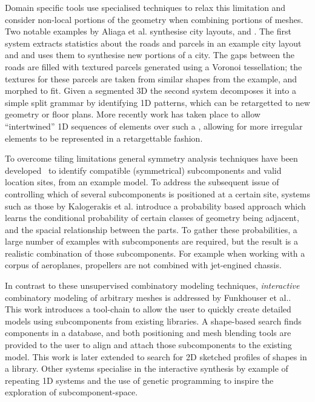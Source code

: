 Domain specific tools use specialised techniques to relax this limitation and consider non-local portions of the geometry when combining portions of meshes. 
Two notable examples by Aliaga et al. synthesise city layouts, and 
\facades{}. The first system\cite{Aliaga07} extracts statistics about the roads and parcels in an example city layout and and uses them to synthesise new portions of a city. The gaps between the roads are filled with textured parcels generated using a Voronoi tessellation; the textures for these parcels are taken from similar shapes from the example, and morphed to fit. Given a segmented 3D \facade{} the second system\cite{Aliaga07} decomposes it into a simple split grammar by identifying 1D patterns, which can be retargetted to new geometry or floor plans. More recently work has taken place to allow ``intertwined'' 1D sequences of elements over such a \facade{}, allowing for more irregular elements to be represented in a retargettable fashion\cite{Lin11}.

To overcome tiling limitations general symmetry analysis techniques have been developed~\cite{Mitra06} to identify compatible (symmetrical) subcomponents and valid location sites, from an example model\cite{Bokeloh10}. To address the subsequent issue of controlling which of several subcomponents is positioned at a certain site, systems such as those by Kalogerakis et al. introduce a probability based approach\cite{Kalogerakis12} which learns the conditional probability of certain classes of geometry being adjacent, and the spacial relationship between the parts. To gather these probabilities, a large number of examples with subcomponents are required, but the result is a realistic combination of those subcomponents. For example when working with a corpus of aeroplanes, propellers are not combined with jet-engined chassis. 

In contrast to these unsupervised combinatory modeling techniques, \emph{interactive} combinatory modeling of arbitrary meshes is addressed by Funkhouser et al.\cite{Funkhouser04}. This work introduces a tool-chain to allow the user to quickly create detailed models using subcomponents from existing libraries. A shape-based search finds components in a database, and both positioning and mesh blending tools are provided to the user to align and attach those subcomponents to the existing model. This work is later extended to search for 2D sketched profiles of shapes in a library\cite{Lee08}. Other systems specialise in the interactive synthesis by example of repeating 1D systems\cite{Owada06} and the use of genetic programming to inspire the exploration of subcomponent-space\cite{Xu12}.

